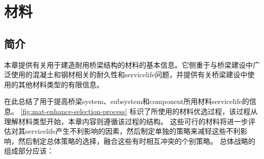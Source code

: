 \chapter{材料}\label{chp:materials}
\section{简介}
本章提供有关用于建造耐用桥梁结构的材料的基本信息。它侧重于与桥梁建设中广泛使用的混凝土和钢材相关的耐久性和\gls*{servicelife}问题，并提供有关桥梁建设中使用的其他材料类型的有限信息。

在此总结了用于提高桥梁\gls*{system}、\gls*{subsystem}和\gls*{component}所用材料\gls*{servicelife}的信息。 \cref{fig:mat-enhance-selection-process} 标识了所使用的材料优选过程，该过程从理解材料类型开始，本章内容则遵循该过程的结构。 这些可行的材料将进一步评估对其\gls*{servicelife}产生不利影响的因素，然后制定单独的策略来减轻这些不利影响，然后制定总体策略的选择，融合这些有时相互冲突的个别策略。 总体战略的组成部分应该：

